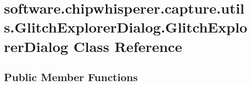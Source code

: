 \hypertarget{classsoftware_1_1chipwhisperer_1_1capture_1_1utils_1_1GlitchExplorerDialog_1_1GlitchExplorerDialog}{}\section{software.\+chipwhisperer.\+capture.\+utils.\+Glitch\+Explorer\+Dialog.\+Glitch\+Explorer\+Dialog Class Reference}
\label{classsoftware_1_1chipwhisperer_1_1capture_1_1utils_1_1GlitchExplorerDialog_1_1GlitchExplorerDialog}
\subsection*{Public Member Functions}
